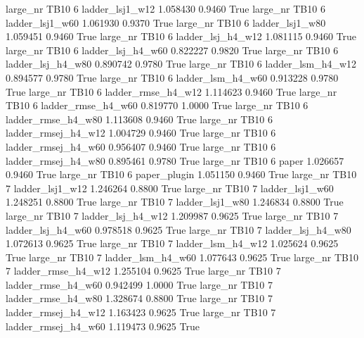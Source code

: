   large_nr     TB10                 6     ladder_lsj1_w12    1.058430      0.9460    True
  large_nr     TB10                 6     ladder_lsj1_w60    1.061930      0.9370    True
  large_nr     TB10                 6     ladder_lsj1_w80    1.059451      0.9460    True
  large_nr     TB10                 6   ladder_lsj_h4_w12    1.081115      0.9460    True
  large_nr     TB10                 6   ladder_lsj_h4_w60    0.822227      0.9820    True
  large_nr     TB10                 6   ladder_lsj_h4_w80    0.890742      0.9780    True
  large_nr     TB10                 6   ladder_lsm_h4_w12    0.894577      0.9780    True
  large_nr     TB10                 6   ladder_lsm_h4_w60    0.913228      0.9780    True
  large_nr     TB10                 6  ladder_rmse_h4_w12    1.114623      0.9460    True
  large_nr     TB10                 6  ladder_rmse_h4_w60    0.819770      1.0000    True
  large_nr     TB10                 6  ladder_rmse_h4_w80    1.113608      0.9460    True
  large_nr     TB10                 6 ladder_rmsej_h4_w12    1.004729      0.9460    True
  large_nr     TB10                 6 ladder_rmsej_h4_w60    0.956407      0.9460    True
  large_nr     TB10                 6 ladder_rmsej_h4_w80    0.895461      0.9780    True
  large_nr     TB10                 6               paper    1.026657      0.9460    True
  large_nr     TB10                 6        paper_plugin    1.051150      0.9460    True
  large_nr     TB10                 7     ladder_lsj1_w12    1.246264      0.8800    True
  large_nr     TB10                 7     ladder_lsj1_w60    1.248251      0.8800    True
  large_nr     TB10                 7     ladder_lsj1_w80    1.246834      0.8800    True
  large_nr     TB10                 7   ladder_lsj_h4_w12    1.209987      0.9625    True
  large_nr     TB10                 7   ladder_lsj_h4_w60    0.978518      0.9625    True
  large_nr     TB10                 7   ladder_lsj_h4_w80    1.072613      0.9625    True
  large_nr     TB10                 7   ladder_lsm_h4_w12    1.025624      0.9625    True
  large_nr     TB10                 7   ladder_lsm_h4_w60    1.077643      0.9625    True
  large_nr     TB10                 7  ladder_rmse_h4_w12    1.255104      0.9625    True
  large_nr     TB10                 7  ladder_rmse_h4_w60    0.942499      1.0000    True
  large_nr     TB10                 7  ladder_rmse_h4_w80    1.328674      0.8800    True
  large_nr     TB10                 7 ladder_rmsej_h4_w12    1.163423      0.9625    True
  large_nr     TB10                 7 ladder_rmsej_h4_w60    1.119473      0.9625    True
